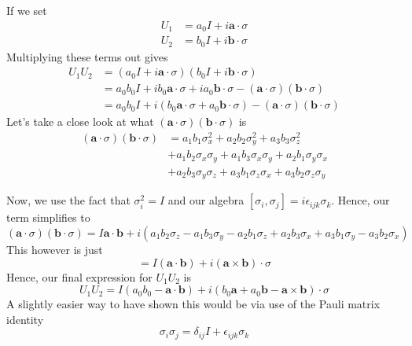 \documentclass[11pt, oneside]{article}   	%
\theoremstyle{slanted}
\begin{document}
If we set 
\begin{align*}
U_1 &=  a_0 I + i \mathbf{ a} \cdot  \sigma  \\
U_2 &=  b_0 I + i \mathbf{ b} \cdot  \sigma  
\end{align*}
Multiplying these terms out gives
\begin{align*}
U_1 U_2 & = (a_0 I + i \mathbf{ a} \cdot  \sigma )( b_0 I + i \mathbf{b} \cdot \sigma ) \\
&=  a_0 b_0 I + i b_0 \mathbf{ a} \cdot  \sigma + i a_0 \mathbf{ b } \cdot  \sigma - ( \mathbf{ a} \cdot \sigma) ( \mathbf{ b } \cdot  \sigma )  \\
&= a_0 b_0 I + i (b_0 \mathbf{ a} \cdot  \sigma + a_ 0 \mathbf{ b } \cdot  \sigma ) - ( \mathbf{ a} \cdot  \sigma) ( \mathbf{ b } \cdot  \sigma )  
\end{align*}
Let's take a close look at what $ ( \mathbf { a} \cdot  \sigma ) ( \mathbf{ b } \cdot  \sigma) $ is
\begin{align*}
( \mathbf{ a} \cdot  \sigma ) ( \mathbf{ b } \cdot  \sigma ) &=  a_1 b_1 \sigma_x ^ 2 + a_2 b_2 \sigma_ y ^ 2 + a_3 b_3 \sigma_ z ^ 2  \\
				     & +   a_1b_2 \sigma_ x \sigma _ y + a_1 b_3 \sigma_ x \sigma _ y + a_2 b_1 \sigma_ y \sigma _ x  \\
& +   a_2 b_3 \sigma _ y \sigma _ z + a_3 b_1 \sigma_ z \sigma _ x + a_3 b_2 \sigma_ z \sigma_ y  
\end{align*} 

Now, we use the fact that $ \sigma_i^ 2 = I$ and our algebra $ [ \sigma_ i , \sigma _ j ] = i \epsilon_{ i j k } \sigma_ k $. 
Hence, our term simplifies to 
\[
( \mathbf{ a} \cdot  \sigma )(  \mathbf { b } \cdot  \sigma) =  I \mathbf{ a} \cdot  \mathbf{ b }  + i ( a_1 b_2 \sigma_ z - a_1 b_3 \sigma_ y - a_2 b_1 \sigma_ z+ a_2 b_3 \sigma_ x + a_3 b_1 \sigma_ y - a_3 b_2 \sigma_ x )  
\] This however is just 
\[
= I ( \mathbf{ a} \cdot  \mathbf{ b } ) + i ( \mathbf{ a} \times \mathbf{ b } ) \cdot  \sigma 
\] Hence, our final expression for $ U_1 U_2 $ is 
\[
U_1 U_2 = I ( a_0 b_0 - \mathbf{ a} \cdot  \mathbf{ b } ) + i ( b_0 \mathbf{ a} + a_0 \mathbf{ b } - \mathbf{ a} \times \mathbf{ b } ) \cdot  \sigma
\] 
A slightly easier way to have shown 
this would be via use of the Pauli matrix 
identity 
\[
\sigma_ i \sigma_ j = \delta_{ ij } I + \epsilon_{ i j k} \sigma_ k 
\]  
\pagebreak 
\end{document}
